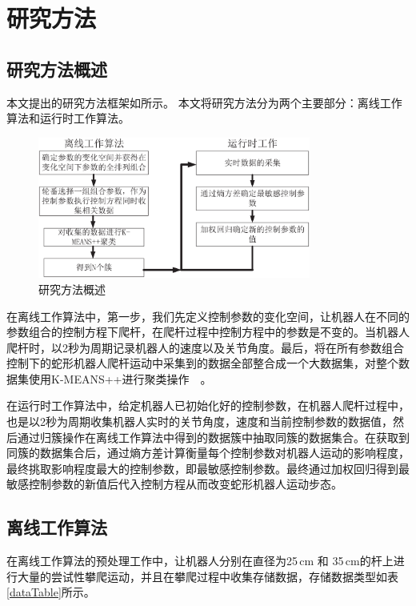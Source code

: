\chapter{研究方法}
\label{cha:method}

\section{研究方法概述}
本文提出的研究方法框架如所示。 本文将研究方法分为两个主要部分：离线工作算法和运行时工作算法。
\begin{figure}[h]
	\centering
	\includegraphics[width=0.8\textwidth]{figure/chap03/step.eps}
	\caption{研究方法概述}
	\label{fig:stepMap}
\end{figure}

在离线工作算法中，第一步，我们先定义控制参数的变化空间，让机器人在不同的参数组合的控制方程下爬杆，在爬杆过程中控制方程中的参数是不变的。当机器人爬杆时，以2秒为周期记录机器人的速度以及关节角度。最后，将在所有参数组合控制下的蛇形机器人爬杆运动中采集到的数据全部整合成一个大数据集，对整个数据集使用K-MEANS++进行聚类操作~\cite{Cluseter_ICT}~\cite{KmeansAndDeepLearning}。

在运行时工作算法中，给定机器人已初始化好的控制参数，在机器人爬杆过程中，也是以2秒为周期收集机器人实时的关节角度，速度和当前控制参数的数据值，然后通过归簇操作在离线工作算法中得到的数据簇中抽取同簇的数据集合。在获取到同簇的数据集合后，通过熵方差计算衡量每个控制参数对机器人运动的影响程度，最终挑取影响程度最大的控制参数，即最敏感控制参数。最终通过加权回归得到最敏感控制参数的新值后代入控制方程从而改变蛇形机器人运动步态。

\section{离线工作算法}
在离线工作算法的预处理工作中，让机器人分别在直径为25\,cm 和 35\,cm的杆上进行大量的尝试性攀爬运动，并且在攀爬过程中收集存储数据，存储数据类型如表\,\ref{dataTable}所示。

